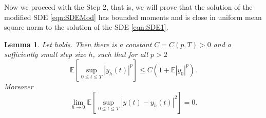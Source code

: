 \documentclass[sort&compress, preprint]{elsarticle}
\theoremstyle{definition}
\theoremstyle{plain}%
\newtheorem{lem}{Lemma}[section]
\theoremstyle{remark}
\newcommand{\m}[1]{\mathbb{E}#1}
\begin{document}
	Now we proceed with the Step 2, that is,  we will prove that the solution  of the modified
SDE \eqref{eqn:SDEMod} has bounded moments and is close in uniform mean square norm to the solution of the SDE 
\eqref{eqn:SDE1}.
\begin{lem}\label{lem:BoundAndConvergenceOfyh}
	Let  holds. Then there is a constant $C=C(p,T)>0$ and a sufficiently small
	step size $h$, such that for all $p>2$
	\begin{equation}\label{eqn:yh-MomentBounds}
		\m\left[
			\sup_{0\leq t \leq T}
				|y_h(t)|^p
		\right]
		\leq
			C
		\left( 
			1+\m |y_0|^p
		\right).
	\end{equation}
	Moreover
	\begin{equation}\label{eqn:yh-convergence}
	\lim_{h \to 0}
	\m\left[
	\sup_{0\leq t \leq T}
	|y(t)-y_h(t)|^2
	\right]=0.
	\end{equation}
\end{lem}
\end{document}
